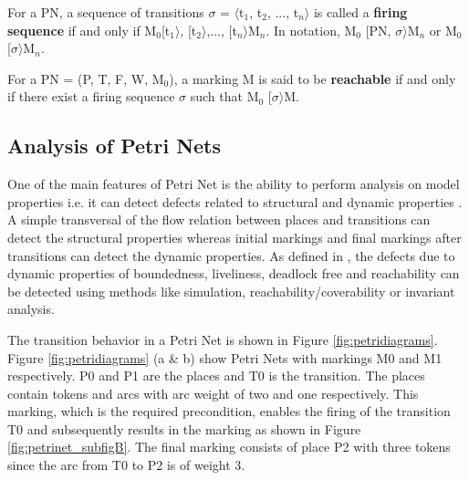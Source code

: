 \begin{definition}
\label{def:def4}
For a PN, a sequence of transitions $ \sigma $ = $ \langle $t$_{1}$, t$_{2}$, ..., t$_{n} \rangle $ is called a \textbf{firing sequence} if and only if M$_{0}$[t$_{1} \rangle $, [t$_{2} \rangle $,..., [t$_{n} \rangle $M$_{n}$. In notation, M$_{0}$ [PN, $ \sigma \rangle $M$_{n}$ or M$_{0}$ [$ \sigma \rangle $M$_{n}$.
\end{definition}

\begin{definition}
\label{def:def5}
For a PN = (P, T, F, W, M$_{0}$), a marking M is said to be \textbf{reachable} if and only if there exist a firing sequence $ \sigma $ such that M$_{0}$ [$ \sigma \rangle $M.
\end{definition}


\subsection{Analysis of Petri Nets}
One of the main features of Petri Net is the ability to perform analysis on model properties i.e. it can detect defects related to structural and dynamic properties \cite{murata1989petri}. A simple transversal of the flow relation between places and transitions can detect the structural properties whereas initial markings and final markings after transitions can detect the dynamic properties. As defined in \cite{reisig2012petri}, the defects due to dynamic properties of boundedness, liveliness, deadlock free and reachability can be detected using methods like simulation, reachability/coverability or invariant analysis.

 The transition behavior in a Petri Net is shown in Figure \ref{fig:petridiagrams}. Figure \ref{fig:petridiagrams} (a \& b) show Petri Nets with markings M0 and M1 respectively.  P0 and P1 are the places and T0 is the transition. The places contain tokens and arcs with arc weight of two and one respectively. This marking, which is the required precondition, enables the firing of the transition T0 and subsequently results in the marking as shown in Figure  \ref{fig:petrinet_subfigB}.  The final marking consists of place P2 with three tokens since the arc from T0 to P2 is of weight 3. 

